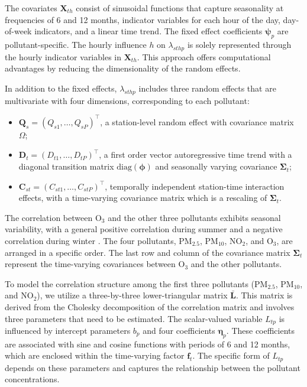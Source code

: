 \documentclass[
  12,
]{article}
\providecommand{\tightlist}{%
  \setlength{\itemsep}{0pt}\setlength{\parskip}{0pt}}
\begin{document}
The covariates \(\symbf{X}_{th}\) consist of sinusoidal functions that
capture seasonality at frequencies of 6 and 12 months, indicator
variables for each hour of the day, day-of-week indicators, and a linear
time trend. The fixed effect coefficients \(\symbf{\psi}_p\) are
pollutant-specific. The hourly influence \(h\) on \(\lambda_{sthp}\) is
solely represented through the hourly indicator variables in
\(\symbf{X}_{th}\). This approach offers computational advantages by
reducing the dimensionality of the random effects.

In addition to the fixed effects, \(\lambda_{sthp}\) includes three
random effects that are multivariate with four dimensions, corresponding
to each pollutant:

\begin{itemize}
    \tightlist
    \item
    $\symbf{Q}_s=(Q_{s1},\dots,Q_{sP})^{\top}$, a station-level random effect with covariance matrix
    $\Omega$;
    \item
    $\symbf{D}_t=(D_{t1},\dots,D_{tP})^{\top}$, a first order vector autoregressive time trend with a
    diagonal transition matrix $\mbox{diag}(\symbf{\phi})$ and
    seasonally varying covariance $\symbf{\Sigma}_t$; 
    \item
    $\symbf{C}_{st}=(C_{st1},\dots,C_{stP})^{\top}$, temporally independent station-time interaction
    effects, with a time-varying covariance matrix which is a rescaling of
    $\symbf{\Sigma}_t$.
\end{itemize}

The correlation between O\(_3\) and the other three pollutants exhibits
seasonal variability, with a general positive correlation during summer
and a negative correlation during winter \autocites[see
e.g.,][]{Chen2019,ChenK2017,Huang2022}. The four pollutants,
PM\(_{2.5}\), PM\(_{10}\), NO\(_2\), and O\(_3\), are arranged in a
specific order. The last row and column of the covariance matrix
\(\symbf{\Sigma}_t\) represent the time-varying covariances between
O\(_3\) and the other pollutants.

To model the correlation structure among the first three pollutants
(PM\(_{2.5}\), PM\(_{10}\), and NO\(_2\)), we utilize a three-by-three
lower-triangular matrix \(\symbf{\bar{L}}\). This matrix is derived from
the Cholesky decomposition of the correlation matrix and involves three
parameters that need to be estimated. The scalar-valued variable
\(L_{tp}\) is influenced by intercept parameters \(b_p\) and four
coefficients \(\symbf{\eta}_p\). These coefficients are associated with
sine and cosine functions with periods of 6 and 12 months, which are
enclosed within the time-varying factor \(\symbf{f}_t\). The specific
form of \(L_{tp}\) depends on these parameters and captures the
relationship between the pollutant concentrations.
\end{document}
